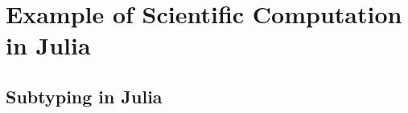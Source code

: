 \chapter{Example of Scientific Computation in Julia}
\label{app:jlscicomp}



\section{Subtyping in Julia}
\label{app:subtyping}


